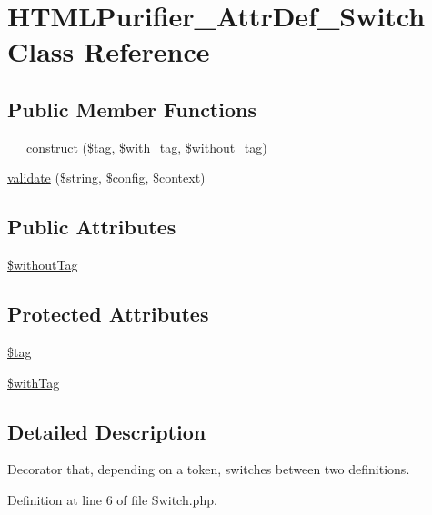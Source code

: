 \hypertarget{classHTMLPurifier__AttrDef__Switch}{\section{H\+T\+M\+L\+Purifier\+\_\+\+Attr\+Def\+\_\+\+Switch Class Reference}
\label{classHTMLPurifier__AttrDef__Switch}
}
\subsection*{Public Member Functions}
\begin{DoxyCompactItemize}
\item 
\hyperlink{classHTMLPurifier__AttrDef__Switch_ab462a504843b4cc934ddacb0baad85d8}{\+\_\+\+\_\+construct} (\$\hyperlink{classtag}{tag}, \$with\+\_\+tag, \$without\+\_\+tag)
\item 
\hyperlink{classHTMLPurifier__AttrDef__Switch_aeafd70da47132b5e267fd5dab3d369af}{validate} (\$string, \$config, \$context)
\end{DoxyCompactItemize}
\subsection*{Public Attributes}
\begin{DoxyCompactItemize}
\item 
\hyperlink{classHTMLPurifier__AttrDef__Switch_a2cb92c5090091aae410ff7300ff4511e}{\$without\+Tag}
\end{DoxyCompactItemize}
\subsection*{Protected Attributes}
\begin{DoxyCompactItemize}
\item 
\hyperlink{classHTMLPurifier__AttrDef__Switch_af5673fdba8457304443a33819c04ae6e}{\$tag}
\item 
\hyperlink{classHTMLPurifier__AttrDef__Switch_a2b3eddccdafb76e7280bd4e877653f68}{\$with\+Tag}
\end{DoxyCompactItemize}


\subsection{Detailed Description}
Decorator that, depending on a token, switches between two definitions. 

Definition at line 6 of file Switch.\+php.



